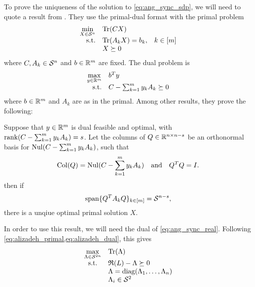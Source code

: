 To prove the uniqueness of the solution to \eqref{eq:ang_sync_sdp}, we will need to quote a result from \cite{alizadeh1997nondegeneracy}.  They use the primal-dual format with the primal problem
\begin{equation}
  \begin{array}{rlc}
    \displaystyle \min_{X \in \mathcal{S}^n} & \operatorname{Tr}(C X) \\
    \text{s.t.} & \operatorname{Tr}(A_k X) = b_k, & k \in [m] \\
    & X \succeq 0
  \end{array} \label{eq:alizadeh_primal}
\end{equation}
where $C, A_k \in \mathcal{S}^n$ and $b \in \mathbb{R}^m$ are fixed.  The dual problem is
\begin{equation}
  \begin{array}{rl}
    \displaystyle\max_{y \in \mathbb{R}^m} & b^T y \\
    \text{s.t.} & C - \sum_{k = 1}^m y_k A_k \succeq 0
  \end{array} \label{eq:alizadeh_dual}
\end{equation}
where $b \in \mathbb{R}^m$ and $A_k$ are as in the primal.  Among other results, they prove the following:

\begin{proposition}
  Suppose that $y \in \mathbb{R}^m$ is dual feasible and optimal, with $\operatorname{rank}(C - \sum_{k = 1}^m y_k A_k) = s$.  Let the columns of $Q \in \mathbb{R}^{n \times n - s}$ be an orthonormal basis for $\operatorname{Nul}(C - \sum_{k = 1}^m y_k A_k)$, such that  \[\operatorname{Col}(Q) = \operatorname{Nul}(C - \sum_{k = 1}^m y_k A_k) \quad \text{and} \quad Q^T Q = I.\] then if \begin{equation} \operatorname{span} \{Q^T A_k Q\}_{k \in [m]} = \mathcal{S}^{n - s} \label{eq:dual_nondegen},\end{equation} there is a unqiue optimal primal solution $X$. \label{prop:primal_unique}
\end{proposition}

In order to use this result, we will need the dual of \eqref{eq:ang_sync_real}.  Following \cref{eq:alizadeh_primal,eq:alizadeh_dual}, this gives
\begin{equation}
  \begin{array}{cl}
    \max\limits_{\Lambda \in \mathcal{S}^{2n}} & \operatorname{Tr}(\Lambda) \\
    \text{s.t.} & \mathfrak{R}(L) - \Lambda \succeq 0 \\
    & \Lambda = \operatorname{diag}(\Lambda_1, \ldots, \Lambda_n) \\
    & \Lambda_i \in \mathcal{S}^2
  \end{array} \label{eq:ang_sync_real_dual}
\end{equation}

